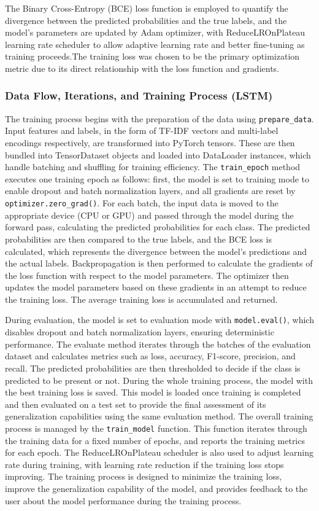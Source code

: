 \documentclass{article}
\begin{document}
The Binary Cross-Entropy (BCE) loss function is employed to quantify the divergence between the predicted probabilities and the true labels, and the model's parameters are updated by Adam optimizer, with ReduceLROnPlateau learning rate scheduler to allow adaptive learning rate and better fine-tuning as training proceeds.The training loss was chosen to be the primary optimization metric due to its direct relationship with the loss function and gradients.
\subsubsection{Data Flow, Iterations, and Training Process (LSTM)}
The training process begins with the preparation of the data using \texttt{prepare\_data}. Input features and labels, in the form of TF-IDF vectors and multi-label encodings respectively, are transformed into PyTorch tensors. These are then bundled into TensorDataset objects and loaded into DataLoader instances, which handle batching and shuffling for training efficiency. The \texttt{train\_epoch} method executes one training epoch as follows: first, the model is set to training mode to enable dropout and batch normalization layers, and all gradients are reset by \texttt{optimizer.zero\_grad()}. For each batch, the input data is moved to the appropriate device (CPU or GPU) and passed through the model during the forward pass, calculating the predicted probabilities for each class. The predicted probabilities are then compared to the true labels, and the BCE loss is calculated, which represents the divergence between the model's predictions and the actual labels. Backpropagation is then performed to calculate the gradients of the loss function with respect to the model parameters. The optimizer then updates the model parameters based on these gradients in an attempt to reduce the training loss. The average training loss is accumulated and returned.

During evaluation, the model is set to evaluation mode with \texttt{model.eval()}, which disables dropout and batch normalization layers, ensuring deterministic performance. The evaluate method iterates through the batches of the evaluation dataset and calculates metrics such as loss, accuracy, F1-score, precision, and recall. The predicted probabilities are then thresholded to decide if the class is predicted to be present or not. During the whole training process, the model with the best training loss is saved. This model is loaded once training is completed and then evaluated on a test set to provide the final assessment of its generalization capabilities using the same evaluation method. The overall training process is managed by the \texttt{train\_model} function. This function iterates through the training data for a fixed number of epochs, and reports the training metrics for each epoch. The ReduceLROnPlateau scheduler is also used to adjust learning rate during training, with learning rate reduction if the training loss stops improving. The training process is designed to minimize the training loss, improve the generalization capability of the model, and provides feedback to the user about the model performance during the training process.
\end{document}
